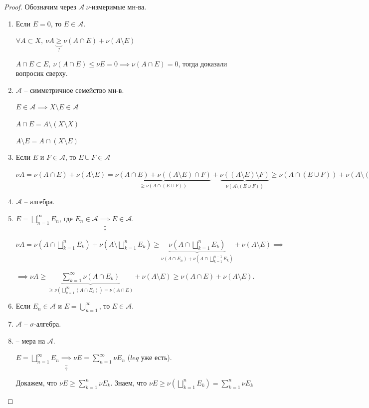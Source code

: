 \begin{proof}
    Обозначим через $\mathcal{A} \ \nu$-измеримые мн-ва. 

    \begin{enumerate}
        \item {
            Если $E = 0$, то $E \in \mathcal{A}$. 

            $\forall A \subset X, \ \nu A \underbrace{\geq}_{?} \nu (A \cap E) + \nu (A \setminus E)$

            $A \cap E \subset E, \ \nu (A \cap E) \leq \nu E = 0 \implies \nu (A \cap E) = 0$, тогда доказали вопросик сверху. 
        }
        \item {
            $\mathcal{A}$ -- симметричное семейство мн-в.
            
            $E \in \mathcal{A} \implies X \setminus E \in \mathcal{A}$
            
            $A \cap E = A \setminus (X \setminus X)$

            $A \setminus E = A \cap (X \setminus E)$
        }
        \item {
            Если $E$ и $F \in \mathcal{A}$, то $E \cup F \in \mathcal{A}$
            
            $\nu A = \nu (A \cap E) + \nu (A \setminus E) = \underbrace{\nu (A \cap E) + \nu ((A \setminus E) \cap F)}_{\geq \nu (A \cap (E \cup F))} + \underbrace{\nu ((A \setminus E) \setminus F)}_{\nu (A \setminus (E \cup F))} \geq \nu (A \cap (E \cup F)) + \nu (A \setminus (E \cup F))$
        }
        \item $\mathcal{A}$ -- алгебра.
        \item {
            $E = \bigsqcup_{n=1}^{\infty}E_n$, где $E_n \in \mathcal{A} \underbrace{\implies}_{?} E \in \mathcal{A}$.

            $\nu A = \nu (A \cap \bigsqcup_{k=1}^{n} E_k) + \nu (A \setminus \bigsqcup_{k=1}^{n} E_k) \geq \underbrace{\nu (A \cap \bigsqcup_{k=1}^{n} E_k)}_{\nu (A \cap E_n) + \nu (A \cap \bigsqcup_{k=1}^{n-1}E_k)} + \nu (A \setminus E) \implies$
            
            $\implies \nu A \geq \underbrace{\sum_{k=1}^{\infty} \nu (A \cap E_k)}_{\geq \nu (\bigcup_{k=1}^{\infty} (A \cap E_k)) = \nu (A \cap E)} + \nu (A \setminus E) \geq \nu (A \cap E) + \nu (A \setminus E)$.

        }
        \item Если $E_n \in \mathcal{A}$ и $E = \bigcup_{n=1}^{\infty}$, то $E \in \mathcal{A}$.
        \item $\mathcal{A}$ -- $\sigma$-алгебра.
        \item {
            \nu -- мера на $\mathcal{A}$.

            $E = \bigsqcup_{n=1}^{\infty} E_n \underbrace{\implies}_{?} \nu E = \sum_{n=1}^{\infty} \nu E_n$ ($leq$ уже есть).

            Докажем, что $\nu E \geq \sum_{k=1}^{n} \nu E_k$. Знаем, что $\nu E \geq \nu (\bigsqcup_{k=1}^{n} E_k) = \sum_{k=1}^{n} \nu E_k$
        }
    \end{enumerate}
\end{proof}

